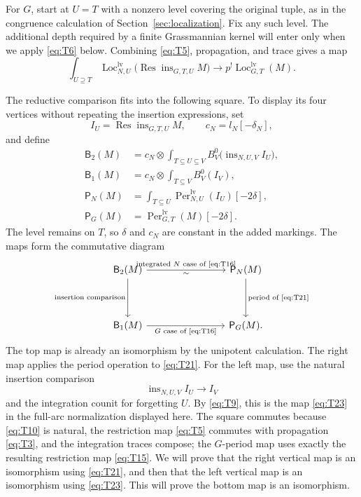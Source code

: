 For $G$, start at $U=T$ with a nonzero level covering the original tuple,
as in the congruence calculation of Section~\ref{sec:localization}.
Fix any such level.  The additional depth required by a finite
Grassmannian kernel will enter only when we apply \eqref{eq:T6} below.
Combining \eqref{eq:T5}, propagation, and trace gives a map
\begin{equation}\label{eq:T21}
 \int_{U\supseteq T}
  \operatorname{Loc}_{N,U}^{\mathrm{lv}}
       \bigl(\operatorname{Res}\operatorname{ins}_{G,T,U}M\bigr)
 \longrightarrow p^!\operatorname{Loc}_{G,T}^{\mathrm{lv}}(M).
\end{equation}

The reductive comparison fits into the following square.  To display its
four vertices without repeating the insertion expressions, set
\[
 I_U=\operatorname{Res}\operatorname{ins}_{G,T,U}M,
 \qquad c_N=l_N[-\delta_N],
\]
and define
\[
\begin{aligned}
 \mathsf B_2(M)
   &=c_N\otimes\int_{T\subseteq U\subseteq V}
       B_V^0\bigl(\operatorname{ins}_{N,U,V}I_U\bigr),\\
 \mathsf B_1(M)
   &=c_N\otimes\int_{T\subseteq V}B_V^0(I_V),\\
 \mathsf P_N(M)
   &=\int_{T\subseteq U}\operatorname{Per}_{N,U}^{\mathrm{lv}}(I_U)
                                            [-2\delta],\\
 \mathsf P_G(M)
   &=\operatorname{Per}_{G,T}^{\mathrm{lv}}(M)[-2\delta].
\end{aligned}
\]
The level remains on $T$, so $\delta$ and $c_N$ are constant in the added
markings.  The maps form the commutative diagram
\begin{equation}\label{eq:ran-reductive-square}
\begin{tikzcd}[column sep=8em,row sep=4em]
 \mathsf B_2(M)
   \arrow[r,"\text{integrated $N$ case of \eqref{eq:T16}}","\sim"']
   \arrow[d,"\text{insertion comparison}"']
 &\mathsf P_N(M)
   \arrow[d,"\text{period of \eqref{eq:T21}}"]\\
 \mathsf B_1(M)
   \arrow[r,"\text{$G$ case of \eqref{eq:T16}}"']
 &\mathsf P_G(M).
\end{tikzcd}
\end{equation}
The top map is already an isomorphism by the unipotent calculation.  The
right map applies the period operation to \eqref{eq:T21}.  For the left
map, use the natural insertion comparison
\[
 \operatorname{ins}_{N,U,V}I_U\longrightarrow I_V
\]
and the integration counit for forgetting $U$.  By \eqref{eq:T9}, this is
the map \eqref{eq:T23} in the full-arc normalization displayed here.
The square commutes because \eqref{eq:T10} is natural, the restriction
map \eqref{eq:T5} commutes with propagation \eqref{eq:T3}, and the
integration traces compose; the $G$-period map uses exactly the resulting
restriction map \eqref{eq:T15}.  We will prove that the right vertical
map is an isomorphism using \eqref{eq:T21}, and then that the left
vertical map is an isomorphism using \eqref{eq:T23}.  This will prove the
bottom map is an isomorphism.

